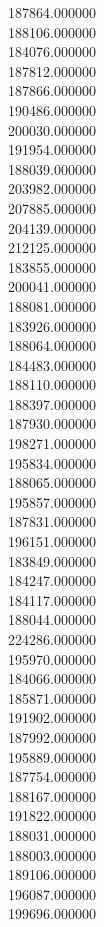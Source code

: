 187864.000000\\
188106.000000\\
184076.000000\\
187812.000000\\
187866.000000\\
190486.000000\\
200030.000000\\
191954.000000\\
188039.000000\\
203982.000000\\
207885.000000\\
204139.000000\\
212125.000000\\
183855.000000\\
200041.000000\\
188081.000000\\
183926.000000\\
188064.000000\\
184483.000000\\
188110.000000\\
188397.000000\\
187930.000000\\
198271.000000\\
195834.000000\\
188065.000000\\
195857.000000\\
187831.000000\\
196151.000000\\
183849.000000\\
184247.000000\\
184117.000000\\
188044.000000\\
224286.000000\\
195970.000000\\
184066.000000\\
185871.000000\\
191902.000000\\
187992.000000\\
195889.000000\\
187754.000000\\
188167.000000\\
191822.000000\\
188031.000000\\
188003.000000\\
189106.000000\\
196087.000000\\
199696.000000\\
